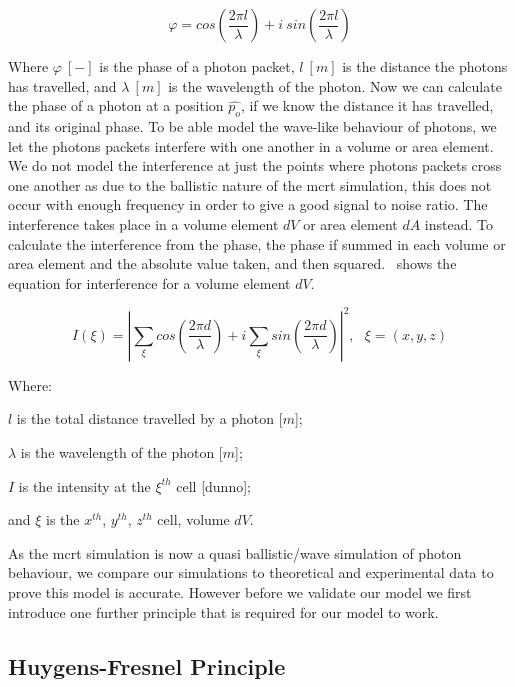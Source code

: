 \begin{equation}
    \varphi = cos\left(\frac{2 \pi l}{\lambda}\right) + i\ sin\left(\frac{2 \pi l}{\lambda}\right)
    \label{eqn:phase}
\end{equation}

Where $\varphi~[-]$ is the phase of a photon packet, $l\ [m]$ is the distance the photons has travelled, and $\lambda~[m]$ is the wavelength of the photon.
Now we can calculate the phase of a photon at a position $\hat{p_o}$, if we know the distance it has travelled, and its original phase. 
To be able model the wave-like behaviour of photons, we let the photons packets interfere with one another in a volume or area element. 
We do not model the interference at just the points where photons packets cross one another as due to the ballistic nature of the \gls{mcrt} simulation, this does not occur with enough frequency in order to give a good signal to noise ratio. 
The interference takes place in a volume element $dV$ or area element $dA$ instead.
To calculate the interference from the phase, the phase if summed in each volume or area element and the absolute value taken, and then squared.~ shows the equation for interference for a volume element $dV$.

\begin{equation}
I(\xi)=\left| \sum\limits_{\xi}cos\left(\frac{2\pi d}{\lambda}\right) + i \sum\limits_{\xi}sin\left(\frac{2\pi d}{\lambda}\right)\right|^2,\ \ \ \xi=(x,y,z)
\label{eqn:intense}
\end{equation}

\noindent Where:

\indent $l$ is the total distance travelled by a photon [$m$];

\indent $\lambda$ is the wavelength of the photon [$m$];

\indent $I$ is the intensity at the $\xi^{th}$ cell [dunno];

\indent and $\xi$ is the $x^{th}$, $y^{th}$, $z^{th}$ cell, volume $dV$.

\medskip

As the \gls{mcrt} simulation is now a quasi ballistic/wave simulation of photon behaviour, we compare our simulations to theoretical and experimental data to prove this model is accurate. However before we validate our model we first introduce one further principle that is required for our model to work.

\subsection{Huygens-Fresnel Principle}

